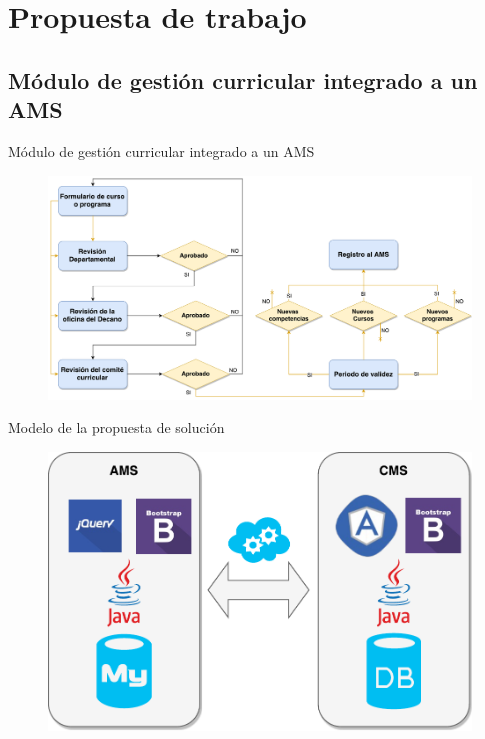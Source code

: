 \documentclass[10pt,xcolor=table ]{beamer}
\begin{document}
\section{Propuesta de trabajo}
\subsection{Módulo de gestión curricular integrado a un AMS}
\begin{frame}{Módulo de gestión curricular integrado a un AMS}
	\begin{figure}
		\centering
	    \includegraphics[scale=0.25,left]{../Figuras/proposal}
	\end{figure}
\end{frame}

\begin{frame}{Modelo de la propuesta de solución}
	\begin{figure}
		\centering
	    \includegraphics[scale=0.55]{../Figuras/architecture}
	\end{figure}
\end{frame}
\end{document}
